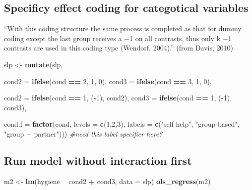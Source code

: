 \documentclass[]{article}
\newenvironment{Shaded}{\begin{snugshade}}{\end{snugshade}}
\newcommand{\KeywordTok}[1]{\textcolor[rgb]{0.13,0.29,0.53}{\textbf{#1}}}
\newcommand{\DataTypeTok}[1]{\textcolor[rgb]{0.13,0.29,0.53}{#1}}
\newcommand{\DecValTok}[1]{\textcolor[rgb]{0.00,0.00,0.81}{#1}}
\newcommand{\StringTok}[1]{\textcolor[rgb]{0.31,0.60,0.02}{#1}}
\newcommand{\CommentTok}[1]{\textcolor[rgb]{0.56,0.35,0.01}{\textit{#1}}}
\newcommand{\OperatorTok}[1]{\textcolor[rgb]{0.81,0.36,0.00}{\textbf{#1}}}
\newcommand{\NormalTok}[1]{#1}
\begin{document}
\subsection{Specificy effect coding for categotical
variables}\label{specificy-effect-coding-for-categotical-variables}

``With this coding structure the same process is completed as that for
dummy coding except the last group receives a −1 on all contrasts, thus
only k −1 contrasts are used in this coding type (Wendorf, 2004).''
(from Davis, 2010)

\begin{Shaded}
\begin{Highlighting}[]
\NormalTok{slp <-}\StringTok{ }\KeywordTok{mutate}\NormalTok{(slp,}
              
              \DataTypeTok{cond2 =} \KeywordTok{ifelse}\NormalTok{(cond }\OperatorTok{==}\StringTok{ }\DecValTok{2}\NormalTok{, }\DecValTok{1}\NormalTok{, }\DecValTok{0}\NormalTok{),}
              \DataTypeTok{cond3 =} \KeywordTok{ifelse}\NormalTok{(cond }\OperatorTok{==}\StringTok{ }\DecValTok{3}\NormalTok{, }\DecValTok{1}\NormalTok{, }\DecValTok{0}\NormalTok{),}
              
              \DataTypeTok{cond2 =} \KeywordTok{ifelse}\NormalTok{(cond }\OperatorTok{==}\StringTok{ }\DecValTok{1}\NormalTok{, (}\OperatorTok{-}\DecValTok{1}\NormalTok{), cond2),}
              \DataTypeTok{cond3 =} \KeywordTok{ifelse}\NormalTok{(cond }\OperatorTok{==}\StringTok{ }\DecValTok{1}\NormalTok{, (}\OperatorTok{-}\DecValTok{1}\NormalTok{), cond3),}
              
              \DataTypeTok{cond.f =} \KeywordTok{factor}\NormalTok{(cond, }\DataTypeTok{levels =} \KeywordTok{c}\NormalTok{(}\DecValTok{1}\NormalTok{,}\DecValTok{2}\NormalTok{,}\DecValTok{3}\NormalTok{), }\DataTypeTok{labels =} \KeywordTok{c}\NormalTok{(}\StringTok{"self help"}\NormalTok{, }\StringTok{"group-based"}\NormalTok{, }\StringTok{"group + partner"}\NormalTok{))) }\CommentTok{#need this label specifier here?}
\end{Highlighting}
\end{Shaded}

\subsection{Run model without interaction
first}\label{run-model-without-interaction-first}

\begin{Shaded}
\begin{Highlighting}[]
\NormalTok{m2 <-}\StringTok{ }\KeywordTok{lm}\NormalTok{(hygiene }\OperatorTok{~}\StringTok{ }\NormalTok{cond2 }\OperatorTok{+}\StringTok{ }\NormalTok{cond3, }\DataTypeTok{data =}\NormalTok{ slp)}
\KeywordTok{ols_regress}\NormalTok{(m2)}
\end{Highlighting}
\end{Shaded}
\end{document}

